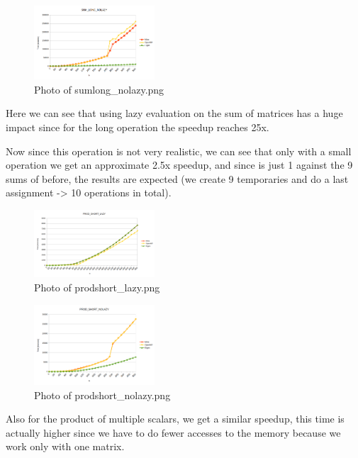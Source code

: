 \documentclass{article}
\begin{document}
\begin{figure}[htbp]
    \centering
    \includegraphics[width=0.4\textwidth]{sumlong_nolazy.png}
    \caption{Photo of sumlong\_nolazy.png}
\end{figure}

Here we can see that using lazy evaluation on the sum of matrices has a huge impact since for the long operation the speedup reaches 25x.

Now since this operation is not very realistic, we can see that only with a small operation we get an approximate 2.5x speedup, and since is just 1 against the 9 sums of before, the results are expected (we create 9 temporaries and do a last assignment -> 10 operations in total).

\begin{figure}[htbp]
    \centering
    \includegraphics[width=0.4\textwidth]{prodshort_lazy.png}
    \caption{Photo of prodshort\_lazy.png}
\end{figure}

\begin{figure}[htbp]
    \centering
    \includegraphics[width=0.4\textwidth]{prodshort_nolazy.png}
    \caption{Photo of prodshort\_nolazy.png}
\end{figure}

Also for the product of multiple scalars, we get a similar speedup, this time is actually higher since we have to do fewer accesses to the memory because we work only with one matrix.
\end{document}
